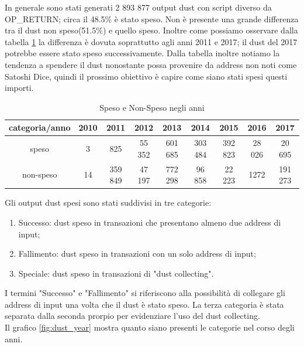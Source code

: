 In generale sono stati generati 2 893 877 output dust con script diverso da OP\_RETURN; circa il 48.5\% è stato speso. Non è presente una grande differenza tra il dust non speso(51.5\%) e quello speso. Inoltre come possiamo osservare dalla tabella \ref{tab:dust_spent_unspent} la differenza è dovuta soprattutto agli anni 2011 e 2017; il dust del 2017 potrebbe essere stato speso successivamente. Dalla tabella inoltre notiamo la tendenza a spendere il dust nonostante possa provenire da address non noti come Satoshi Dice, quindi il prossimo obiettivo è capire come siano stati spesi questi importi.
\begin{table}[H]
    \centering
    \begin{tabular}{|c|c|c|c|c|c|c|c|c|}
        \hline
           categoria/anno   & 2010 & 2011 & 2012 & 2013 & 2014 & 2015 & 2016 & 2017\\
        \hline 
         speso &  3 & 825 & 55 352 & 601 685 & 303 484 & 392 823 & 28 026 & 20 695 \\
         \hline
         non-speso & 14 & 359 849 & 47 197 & 772 298 & 96 858 & 22 223 & 1272 & 191 273  \\
         \hline
    \end{tabular}
    \caption{Speso e Non-Speso negli anni}
    \label{tab:dust_spent_unspent}
\end{table}
Gli output dust spesi sono stati suddivisi in tre categorie:
\begin{enumerate}
    \item Successo: dust speso in transazioni che presentano almeno due address di input;
    \item Fallimento: dust speso in transazioni con un solo address di input;
    \item Speciale: dust speso in transazioni di "dust collecting".
\end{enumerate}
I termini "Successo" e "Fallimento" si riferiscono alla possibilità di collegare gli address di input una volta che il dust è stato speso. La terza categoria è stata separata dalla seconda prorpio per evidenziare l'uso del dust collecting.\\
Il grafico \ref{fig:dust_year} mostra quanto siano presenti le categorie nel corso degli anni.
